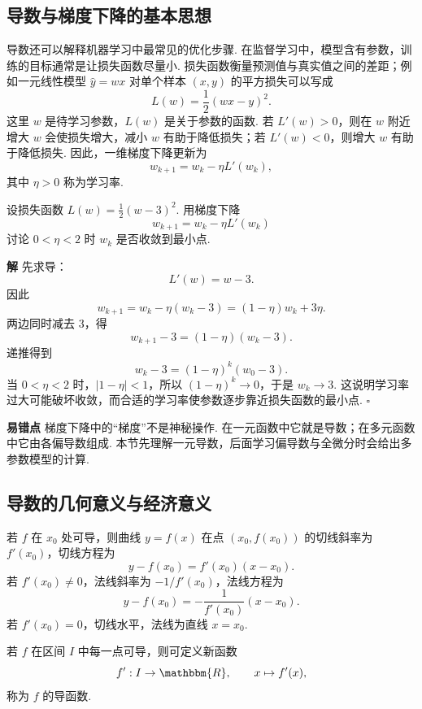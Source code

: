 \documentclass[fontset=fandol]{ctexart}
\newenvironment{solution}{\par\noindent\textbf{解}\quad}{\hfill$\square$\par\vspace{0.8em}}
\newenvironment{warning}{\par\noindent\textbf{易错点}\quad}{\par\vspace{0.8em}}
\newcommand{\RR}{\mathbbm{R}}
\begin{document}
\subsection{导数与梯度下降的基本思想}

导数还可以解释机器学习中最常见的优化步骤. 在监督学习中，模型含有参数，训练的目标通常是让损失函数尽量小. 损失函数衡量预测值与真实值之间的差距；例如一元线性模型 $\hat y=wx$ 对单个样本 $(x,y)$ 的平方损失可以写成
\[
L(w)=\frac12(wx-y)^2.
\]
这里 $w$ 是待学习参数，$L(w)$ 是关于参数的函数. 若 $L'(w)>0$，则在 $w$ 附近增大 $w$ 会使损失增大，减小 $w$ 有助于降低损失；若 $L'(w)<0$，则增大 $w$ 有助于降低损失. 因此，一维梯度下降更新为
\[
w_{k+1}=w_k-\eta L'(w_k),
\]
其中 $\eta>0$ 称为学习率.

\begin{example}
设损失函数 $L(w)=\frac12(w-3)^2$. 用梯度下降
\[
w_{k+1}=w_k-\eta L'(w_k)
\]
讨论 $0<\eta<2$ 时 $w_k$ 是否收敛到最小点.
\end{example}
\begin{solution}
先求导：
\[
L'(w)=w-3.
\]
因此
\[
w_{k+1}=w_k-\eta(w_k-3)=(1-\eta)w_k+3\eta.
\]
两边同时减去 $3$，得
\[
w_{k+1}-3=(1-\eta)(w_k-3).
\]
递推得到
\[
w_k-3=(1-\eta)^k(w_0-3).
\]
当 $0<\eta<2$ 时，$|1-\eta|<1$，所以 $(1-\eta)^k\to0$，于是 $w_k\to3$. 这说明学习率过大可能破坏收敛，而合适的学习率使参数逐步靠近损失函数的最小点.
\end{solution}
\begin{warning}
梯度下降中的“梯度”不是神秘操作. 在一元函数中它就是导数；在多元函数中它由各偏导数组成. 本节先理解一元导数，后面学习偏导数与全微分时会给出多参数模型的计算.
\end{warning}

\subsection{导数的几何意义与经济意义}

\begin{definition}[切线与法线]
若 $f$ 在 $x_0$ 处可导，则曲线 $y=f(x)$ 在点 $(x_0,f(x_0))$ 的切线斜率为 $f'(x_0)$，切线方程为
\[
y-f(x_0)=f'(x_0)(x-x_0).
\]
若 $f'(x_0)\neq0$，法线斜率为 $-1/f'(x_0)$，法线方程为
\[
y-f(x_0)=-\frac{1}{f'(x_0)}(x-x_0).
\]
若 $f'(x_0)=0$，切线水平，法线为直线 $x=x_0$.
\end{definition}

\begin{definition}[导函数]
若 $f$ 在区间 $I$ 中每一点可导，则可定义新函数
\[
f':I\to\RR,\qquad x\mapsto f'(x),
\]
称为 $f$ 的导函数.
\end{definition}
\end{document}
